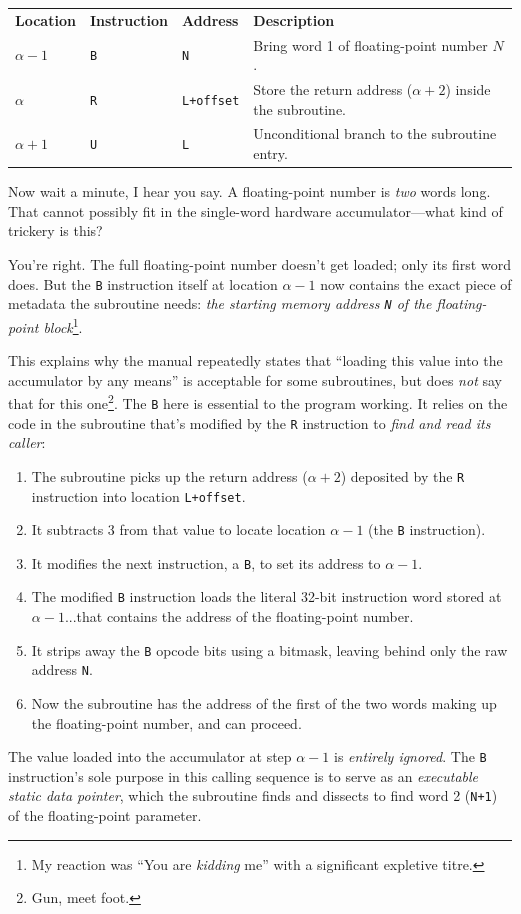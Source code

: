 \begin{center}
\begin{tabularx}{\textwidth}{lllX}
\textbf{Location} & \textbf{Instruction} & \textbf{Address} & \textbf{Description} \\
$\alpha-1$  & \texttt{B} & \texttt{N}        & Bring word 1 of floating-point number $N$. \\
$\alpha$    & \texttt{R} & \texttt{L+offset} & Store the return address ($\alpha+2$) inside the subroutine. \\
$\alpha+1$  & \texttt{U} & \texttt{L}        & Unconditional branch to the subroutine entry. \\
\end{tabularx}
\end{center}

Now wait a minute, I hear you say. A floating-point number is \emph{two} words long. That cannot possibly fit in the single-word hardware accumulator—what kind of trickery is this?

You're right. The full floating-point number doesn't get loaded; only its first word does. But the \texttt{B} instruction itself at location $\alpha-1$ now contains the exact piece of metadata the subroutine needs: \emph{the starting memory address \texttt{N} of the floating-point block}\footnote{My reaction was ``You are \emph{kidding} me'' with a significant expletive titre.}. 

This explains why the manual repeatedly states that ``loading this value into the accumulator by any means'' is acceptable for some subroutines, but does \emph{not} say that for this one\footnote{Gun, meet foot.}. The \texttt{B} here is essential to the program working. It relies on the code in the subroutine that's modified by the \texttt{R} instruction to \emph{find and read its caller}:
\begin{enumerate}
    \item The subroutine picks up the return address ($\alpha+2$) deposited by the \texttt{R} instruction into location \texttt{L+offset}.
    \item It subtracts 3 from that value to locate location $\alpha-1$ (the \texttt{B} instruction).
	\item It modifies the next instruction, a \texttt{B}, to set its address to $\alpha-1$.
    \item The modified \texttt{B} instruction loads the literal 32-bit instruction word stored at $\alpha-1$...that contains the address of the floating-point number.
    \item It strips away the \texttt{B} opcode bits using a bitmask, leaving behind only the raw address \texttt{N}.
	\item Now the subroutine has the address of the first of the two words making up the floating-point number, and can proceed.
\end{enumerate}
The value loaded into the accumulator at step $\alpha-1$ is \emph{entirely ignored}. The \texttt{B} instruction's sole purpose in this calling sequence is to serve as an \emph{executable static data pointer}, which the subroutine finds and dissects to find word 2 (\texttt{N+1}) of the floating-point parameter.

\newpage
